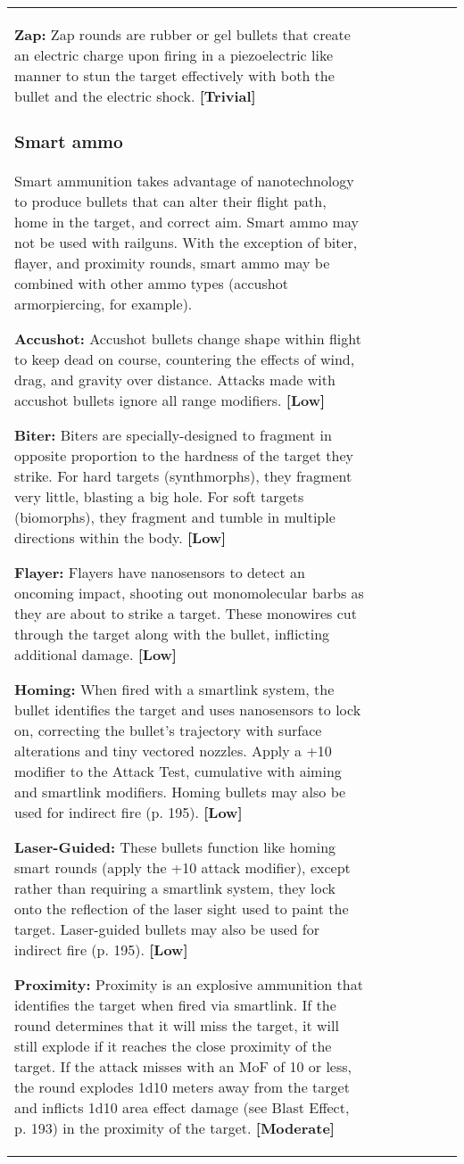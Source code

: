 \begin{tabular}{|l|l|l|l|l|l|l|}
\textbf{Zap:} Zap rounds are rubber or gel bullets that create an electric charge upon firing in a piezoelectric like manner to stun the target effectively with both the bullet and the electric shock. \textbf{[Trivial]} 

\subsubsection{Smart ammo} 

Smart ammunition takes advantage of nanotechnology to produce bullets that can alter their flight path, home in the target, and correct aim. Smart ammo may not be used with railguns. With the exception of biter, flayer, and proximity rounds, smart ammo may be combined with other ammo types (accushot armorpiercing, for example). 

\textbf{Accushot:} Accushot bullets change shape within flight to keep dead on course, countering the effects of wind, drag, and gravity over distance. Attacks made with accushot bullets ignore all range modifiers. \textbf{[Low]} 

\textbf{Biter:} Biters are specially-designed to fragment in opposite proportion to the hardness of the target they strike. For hard targets (synthmorphs), they fragment very little, blasting a big hole. For soft targets (biomorphs), they fragment and tumble in multiple directions within the body. \textbf{[Low]} 

\textbf{Flayer:} Flayers have nanosensors to detect an oncoming impact, shooting out monomolecular barbs as they are about to strike a target. These monowires cut through the target along with the bullet, inflicting additional damage. \textbf{[Low]} 

\textbf{Homing:} When fired with a smartlink system, the bullet identifies the target and uses nanosensors to lock on, correcting the bullet’s trajectory with surface alterations and tiny vectored nozzles. Apply a +10 modifier to the Attack Test, cumulative with aiming and smartlink modifiers. Homing bullets may also be used for indirect fire (p. 195). \textbf{[Low]} 

\textbf{Laser-Guided:} These bullets function like homing smart rounds (apply the +10 attack modifier), except rather than requiring a smartlink system, they lock onto the reflection of the laser sight used to paint the target. Laser-guided bullets may also be used for indirect fire (p. 195). \textbf{[Low]} 

\textbf{Proximity:} Proximity is an explosive ammunition that identifies the target when fired via smartlink. If the round determines that it will miss the target, it will still explode if it reaches the close proximity of the target. If the attack misses with an MoF of 10 or less, the round explodes 1d10 meters away from the target and inflicts 1d10 area effect damage (see Blast Effect, p. 193) in the proximity of the target. \textbf{[Moderate]} 


\end{tabular}
